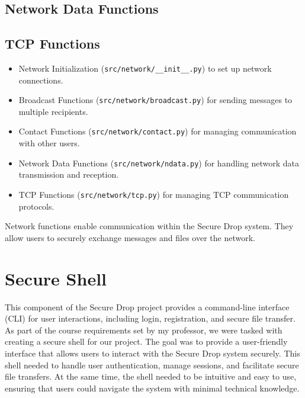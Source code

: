 \documentclass[12pt]{article}
\begin{document}
\subsection{Network Data Functions}


\subsection{TCP Functions}


\begin{itemize}
    \item Network Initialization (\texttt{src/network/\_\_init\_\_.py}) to set up network connections.
    \item Broadcast Functions (\texttt{src/network/broadcast.py}) for sending messages to multiple recipients.
    \item Contact Functions (\texttt{src/network/contact.py}) for managing communication with other users.
    \item Network Data Functions (\texttt{src/network/ndata.py}) for handling network data transmission and reception.
    \item TCP Functions (\texttt{src/network/tcp.py}) for managing TCP communication protocols.
\end{itemize}

Network functions enable communication within the Secure Drop system. They allow users to securely exchange messages and files over the network.

\newpage

\section{Secure Shell}
This component of the Secure Drop project provides a command-line interface (CLI) for user interactions, including login, registration, and secure file transfer.
As part of the course requirements set by my professor, we were tasked with creating a secure shell for our project. The goal was to provide a user-friendly interface that allows users to interact with the Secure Drop system securely. This shell needed to handle user authentication, manage sessions, and facilitate secure file transfers.
At the same time, the shell needed to be intuitive and easy to use, ensuring that users could navigate the system with minimal technical knowledge.
\end{document}
